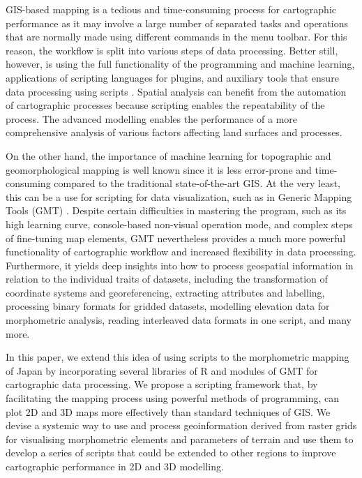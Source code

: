 \documentclass[land,article,accept,pdftex,moreauthors]{Definitions/mdpi}
\begin{document}
GIS-based mapping is a tedious and time-consuming process for cartographic performance as it may involve a large number of separated tasks and operations that are normally made using different commands in the menu toolbar. For this reason, the workflow is split into various steps of data processing. Better still, however, is using the full functionality of the programming and machine learning, applications of scripting languages for plugins, and auxiliary tools that ensure data processing using scripts \cite{NAGHIBI2021101232}. Spatial analysis can benefit from the automation of cartographic processes because scripting enables the repeatability of the process. The advanced modelling enables the performance of a more comprehensive analysis of various factors affecting land surfaces and processes. 

On the other hand, the importance of machine learning for topographic and geomorphological mapping is well known since it is less error-prone and time-consuming compared to the traditional state-of-the-art GIS. At the very least, this can be a use for scripting for data visualization, such as in Generic Mapping Tools (GMT) \cite{FARAG2022229297,data7060074}. Despite certain difficulties in mastering the program, such as its high learning curve, console-based non-visual operation mode, and complex steps of fine-tuning map elements, GMT nevertheless provides a much more powerful functionality of cartographic workflow and increased flexibility in data processing. Furthermore, it yields deep insights into how to process geospatial information in relation to the individual traits of datasets, including the transformation of coordinate systems and georeferencing, extracting attributes and labelling, processing binary formats for gridded datasets, modelling elevation data for morphometric analysis, reading interleaved data formats in one script, and many more.

In this paper, we extend this idea of using scripts to the morphometric mapping of Japan by incorporating several libraries of R and modules of GMT for cartographic data processing. We propose a scripting framework that, by facilitating the mapping process using powerful methods of programming, can plot 2D and 3D maps more effectively than standard techniques of GIS. We devise a systemic way to use and process geoinformation derived from raster grids for visualising morphometric elements and parameters of terrain and use them to develop a series of scripts that could be extended to other regions to improve cartographic performance in 2D and 3D modelling.
\end{document}
